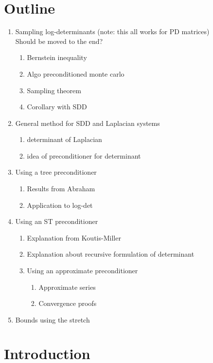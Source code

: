 
\section*{Outline}
\begin{enumerate}
\item Sampling log-determinants (note: this all works for PD matrices)\\
 Should be moved to the end?

\begin{enumerate}
\item Bernstein inequality 
\item Algo preconditioned monte carlo 
\item Sampling theorem 
\item Corollary with SDD 
\end{enumerate}
\item General method for SDD and Laplacian systems

\begin{enumerate}
\item determinant of Laplacian 
\item idea of preconditioner for determinant 
\end{enumerate}
\item Using a tree preconditioner

\begin{enumerate}
\item Results from Abraham 
\item Application to log-det 
\end{enumerate}
\item Using an ST preconditioner

\begin{enumerate}
\item Explanation from Koutis-Miller 
\item Explanation about recursive formulation of determinant 
\item Using an approximate preconditioner

\begin{enumerate}
\item Approximate series 
\item Convergence proofs 
\end{enumerate}
\end{enumerate}
\item Bounds using the stretch 
\end{enumerate}

\section{Introduction}

